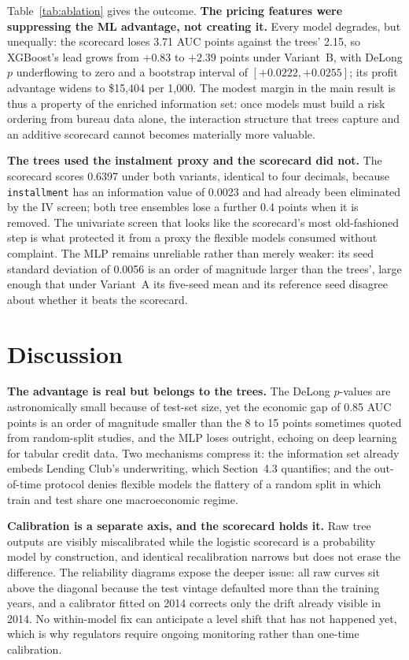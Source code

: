 \documentclass[a4paper,twocolumn,10pt]{article}
\begin{document}
Table~\ref{tab:ablation} gives the outcome. \textbf{The pricing features were suppressing the ML advantage, not creating it.} Every model degrades, but unequally: the scorecard loses 3.71 AUC points against the trees' 2.15, so XGBoost's lead grows from $+0.83$ to $+2.39$ points under Variant~B, with DeLong $p$ underflowing to zero and a bootstrap interval of $[+0.0222,+0.0255]$; its profit advantage widens to \$15{,}404 per 1{,}000. The modest margin in the main result is thus a property of the enriched information set: once models must build a risk ordering from bureau data alone, the interaction structure that trees capture and an additive scorecard cannot becomes materially more valuable.

\textbf{The trees used the instalment proxy and the scorecard did not.} The scorecard scores 0.6397 under both variants, identical to four decimals, because \texttt{installment} has an information value of 0.0023 and had already been eliminated by the IV screen; both tree ensembles lose a further 0.4 points when it is removed. The univariate screen that looks like the scorecard's most old-fashioned step is what protected it from a proxy the flexible models consumed without complaint. The MLP remains unreliable rather than merely weaker: its seed standard deviation of 0.0056 is an order of magnitude larger than the trees', large enough that under Variant~A its five-seed mean and its reference seed disagree about whether it beats the scorecard.

\section{Discussion}

\textbf{The advantage is real but belongs to the trees.} The DeLong $p$-values are astronomically small because of test-set size, yet the economic gap of 0.85 AUC points is an order of magnitude smaller than the 8 to 15 points sometimes quoted from random-split studies, and the MLP loses outright, echoing \cite{gunnarsson2021} on deep learning for tabular credit data. Two mechanisms compress it: the information set already embeds Lending Club's underwriting, which Section~4.3 quantifies; and the out-of-time protocol denies flexible models the flattery of a random split in which train and test share one macroeconomic regime.

\textbf{Calibration is a separate axis, and the scorecard holds it.} Raw tree outputs are visibly miscalibrated while the logistic scorecard is a probability model by construction, and identical recalibration narrows but does not erase the difference. The reliability diagrams expose the deeper issue: all raw curves sit above the diagonal because the test vintage defaulted more than the training years, and a calibrator fitted on 2014 corrects only the drift already visible in 2014. No within-model fix can anticipate a level shift that has not happened yet, which is why regulators require ongoing monitoring rather than one-time calibration.
\end{document}
